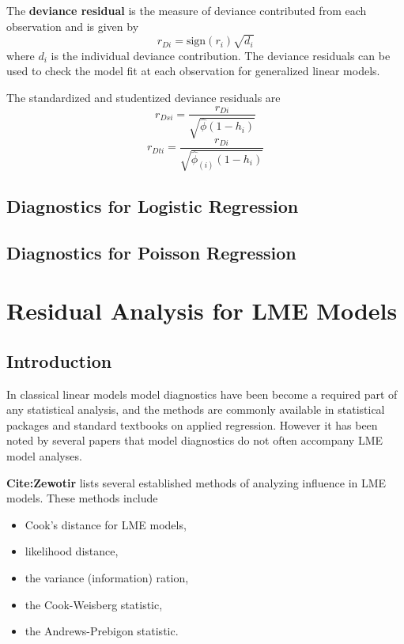 The \textbf{deviance residual} is the measure of deviance contributed from each observation and is given by
\[r_{Di} = \textrm{sign}( r_{i})
 \sqrt{ d_{i}}\]
where $d_i$ is the individual deviance contribution.
The deviance residuals can be used to check the model fit at each observation for generalized linear models. 


The standardized and studentized deviance residuals are
\[
r_{Dsi} = \frac{r_{Di}}{\sqrt{\hat{ \phi} (1- h_{i})} }\]
\[r_{Dti} = \frac{r_{Di}}{\sqrt{ \hat{ \phi}_{(i)}
 (1- h_{i})}}\]
 
\newpage
 
\subsection{Diagnostics for Logistic Regression}

\subsection{Diagnostics for Poisson Regression}
\newpage
\section{Residual Analysis for LME Models}
\subsection{Introduction}%
In classical linear models model diagnostics have been become a required part of any statistical analysis, and the methods are commonly available in statistical packages and standard textbooks on applied regression. However it has been noted by several papers that model diagnostics do not often accompany LME model analyses.

\textbf{Cite:Zewotir} lists several established methods of analyzing influence in LME models. These methods include \begin{itemize}
\item Cook's distance for LME models,
\item {} likelihood distance,
\item the variance (information) ration,
\item the  Cook-Weisberg statistic,
\item the  Andrews-Prebigon statistic.
\end{itemize}


